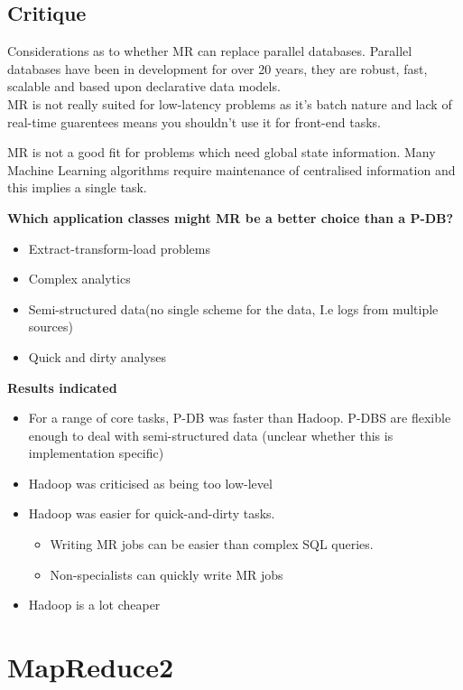 \documentclass[11pt]{article}
\begin{document}
\subsection{Critique}
Considerations as to whether MR can replace parallel databases. Parallel databases have been in development for over 20 years, they are robust, fast, scalable and based upon declarative data models.\\

MR is not really suited for low-latency problems as it's batch nature and lack of real-time guarentees means you shouldn't use it for front-end tasks. 

MR is not a good fit for problems which need global state information. Many Machine Learning algorithms require maintenance of centralised information and this implies a single task.

\textbf{Which application classes might MR be a better choice than a P-DB?}
\begin{itemize}
\item Extract-transform-load problems
\item Complex analytics
\item Semi-structured data(no single scheme for the data, I.e logs from multiple sources)
\item Quick and dirty analyses\\
\end{itemize}

\textbf{Results indicated}
\begin{itemize}
\item For a range of core tasks, P-DB was faster than Hadoop. P-DBS are flexible enough to deal with semi-structured data (unclear whether this is implementation specific)
\item Hadoop was criticised as being too low-level
\item Hadoop was easier for quick-and-dirty tasks. 
\begin{itemize}
\item Writing MR jobs can be easier than complex SQL queries. 
\item Non-specialists can quickly write MR jobs
\end{itemize}
\item Hadoop is a lot cheaper
\end{itemize}

\section{MapReduce2}
\end{document}
